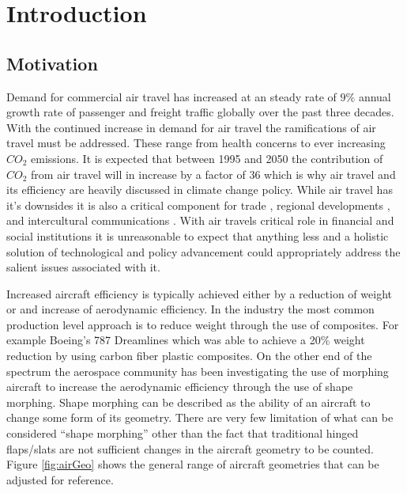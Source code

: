 \documentclass[11pt]{ucthesis}
\begin{document}
\chapter{Introduction}

\section{Motivation}
Demand for commercial air travel has increased at an steady rate of $9\%$ annual growth rate of passenger and freight traffic globally over the past three decades. \cite{upham2003environmental} With the continued increase in demand for air travel the ramifications of air travel must be addressed. These range from health concerns to ever increasing $CO_2$ emissions. It is expected that between 1995 and 2050 the contribution of $CO_2$ from air travel will in increase by a factor of 36 which is why air travel and its efficiency are heavily discussed in climate change policy. \cite{olsthoorn2001carbon} While air travel has it's downsides it is also a critical component for trade \cite{smith2001world}, regional developments \cite{marazzo2010air}, and intercultural communications \cite{adey2007flying}. With air travels critical role in financial and social institutions it is unreasonable to expect that anything less and a holistic solution of technological and policy advancement could appropriately address the salient issues associated with it.

Increased aircraft efficiency is typically achieved either by a reduction of weight or and increase of aerodynamic efficiency. In the industry the most common production level approach is to reduce weight through the use of composites. For example Boeing's 787 Dreamlines which was able to achieve a 20\% weight reduction by using carbon fiber plastic composites. \cite{hale2006boeing} On the other end of the spectrum the aerospace community has been investigating the use of morphing aircraft to increase the aerodynamic efficiency through the use of shape morphing.\cite{barbarino2011review,kuzmina2002review,sofla2010shape} Shape morphing can be described as the ability of an aircraft to change some form of its geometry. There are very few limitation of what can be considered ``shape morphing'' other than the fact that traditional hinged flaps/slats are not sufficient changes in the aircraft geometry to be counted. Figure \ref{fig:airGeo} shows the general range of aircraft geometries that can be adjusted for reference. 
\end{document}
